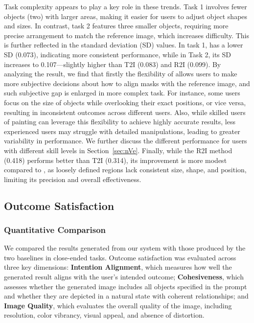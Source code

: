 Task complexity appears to play a key role in these trends. 
Task 1 involves fewer objects (two) with larger areas, making it easier for users to adjust object shapes and sizes. 
In contrast, task 2 features three smaller objects, requiring more precise arrangement to match the reference image, which increases difficulty. 
This is further reflected in the standard deviation (SD) values. 
In task 1, \tool has a lower SD (0.073), indicating more consistent performance, while in Task 2, its SD increases to 0.107—slightly higher than T2I (0.083) and R2I (0.099). 
By analyzing the result, we find that firstly the flexibility of \tool allows users to make more subjective decisions about how to align masks with the reference image, and such subjective gap is enlarged in more complex task. 
For instance, some users focus on the size of objects while overlooking their exact positions, or vice versa, resulting in inconsistent outcomes across different users.
Also, while skilled users of painting can leverage this flexibility to achieve highly accurate results, less experienced users may struggle with detailed manipulations, leading to greater variability in performance. 
We further discuss the different performance for users with different skill levels in Section~\ref{sec:nVe}.
Finally, while the R2I method (0.418) performs better than T2I (0.314), its improvement is more modest compared to \tool, as loosely defined regions lack consistent size, shape, and position, limiting its precision and overall effectiveness.


\subsection{Outcome Satisfaction}\label{ssec:outcome}

\subsubsection{Quantitative Comparison}

    We compared the results generated from our system with those produced by the two baselines in close-ended tasks. 
    Outcome satisfaction was evaluated across three key dimensions: \textbf{Intention Alignment}, which measures how well the generated result aligns with the user's intended outcome; \textbf{Cohesiveness}, which assesses whether the generated image includes all objects specified in the prompt and whether they are depicted in a natural state with coherent relationships; and \textbf{Image Quality}, which evaluates the overall quality of the image, including resolution, color vibrancy, visual appeal, and absence of distortion.

